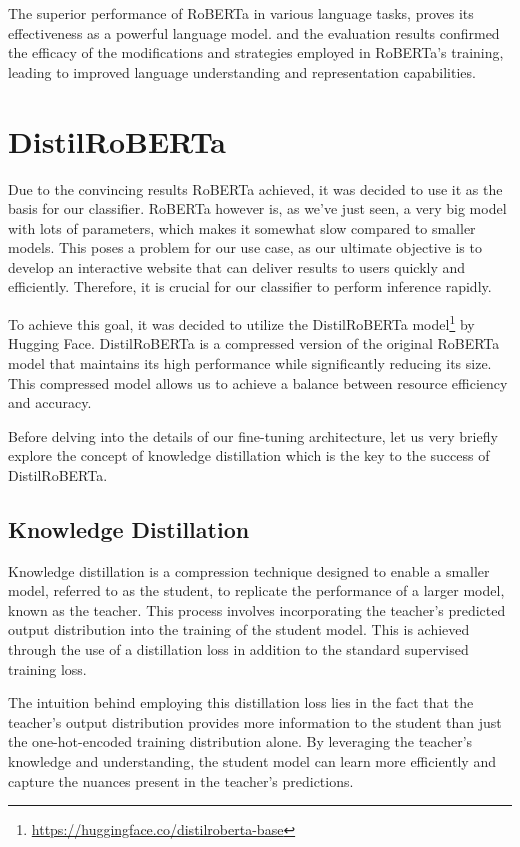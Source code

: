 \documentclass[a4paper,10pt]{report}
\begin{document}
The superior performance of RoBERTa in various language tasks, proves its effectiveness as a powerful language model. and the evaluation results confirmed the efficacy of the modifications and strategies employed in RoBERTa's training, leading to improved language understanding and representation capabilities. \cite{roberta}

\section{DistilRoBERTa} %
Due to the convincing results RoBERTa achieved, it was decided to use it as the basis for our classifier. RoBERTa however is, as we've just seen, a very big model with lots of parameters, which makes it somewhat slow compared to smaller models. This poses a problem for our use case, as our ultimate objective is to develop an interactive website that can deliver results to users quickly and efficiently. Therefore, it is crucial for our classifier to perform inference rapidly.

To achieve this goal, it was decided to utilize the DistilRoBERTa model\footnote{\url{https://huggingface.co/distilroberta-base}} by Hugging Face. DistilRoBERTa is a compressed version of the original RoBERTa model that maintains its high performance while significantly reducing its size. This compressed model allows us to achieve a balance between resource efficiency and accuracy.

Before delving into the details of our fine-tuning architecture, let us very briefly explore the concept of knowledge distillation which is the key to the success of DistilRoBERTa. \cite{distilbert}

\subsection{Knowledge Distillation}
Knowledge distillation is a compression technique designed to enable a smaller model, referred to as the student, to replicate the performance of a larger model, known as the teacher. This process involves incorporating the teacher's predicted output distribution into the training of the student model. This is achieved through the use of a distillation loss in addition to the standard supervised training loss.

The intuition behind employing this distillation loss lies in the fact that the teacher's output distribution provides more information to the student than just the one-hot-encoded training distribution alone. By leveraging the teacher's knowledge and understanding, the student model can learn more efficiently and capture the nuances present in the teacher's predictions. \cite{BucilDistil} \cite{HintonDistilling}
\end{document}
